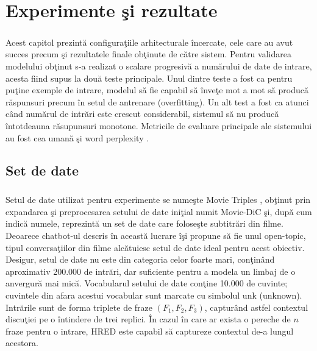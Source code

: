 \chapter{Experimente \c si rezultate}

\paragraph{}
Acest capitol prezint\u a configura\c tiile arhitecturale \^ incercate, cele care au avut succes precum \c si rezultatele finale ob\c tinute de c\u atre sistem. Pentru validarea modelului ob\c tinut s-a realizat o scalare progresiv\u a a num\u arului de date de intrare, acesta fiind supus la dou\u a teste principale. Unul dintre teste a fost ca pentru pu\c tine exemple de intrare, modelul s\u a fie capabil s\u a \^ inve\c te mot a mot s\u a produc\u a r\u aspunsuri precum \^ in setul de antrenare (overfitting). Un alt test a fost ca atunci c\^ and num\u arul de intr\u ari este crescut considerabil, sistemul s\u a nu produc\u a \^ intotdeauna r\u asupunsuri monotone. Metricile de evaluare principale ale sistemului au fost cea uman\u a \c si word perplexity \cite{Bengio:2003:NPL:944919.944966}.

\section{Set de date}

\paragraph{}
Setul de date utilizat pentru experimente se nume\c ste Movie Triples \cite{DBLP:journals/corr/SerbanSBCP15}, ob\c tinut prin expandarea \c si preprocesarea setului de date ini\c tial numit Movie-DiC \cite{Banchs:2012:MMD:2390665.2390716} \c si, dup\u a cum indic\u a numele, reprezint\u a un set de date care folose\c ste subtitr\u ari din filme. Deoarece chatbot-ul descris \^ in aceast\u a lucrare \^ i\c si propune s\u a fie unul open-topic, tipul conversa\c tiilor din filme alc\u atuiesc setul de date ideal pentru acest obiectiv. Desigur, setul de date nu este din categoria celor foarte mari, con\c tin\^ and aproximativ 200.000 de intr\u ari, dar suficiente pentru a modela un limbaj de o anvergur\u a mai mic\u a. Vocabularul setului de date con\c tine 10.000 de cuvinte; cuvintele din afara acestui vocabular sunt marcate cu simbolul unk (unknown). Intr\u arile sunt de forma triplete de fraze \((F_1, F_2, F_3)\), captur\^ and astfel contextul discu\c tiei pe o \^ intindere de trei replici. \^ In cazul \^ in care ar exista o pereche de \(n\) fraze pentru o intrare, HRED este capabil s\u a captureze contextul de-a lungul acestora.

